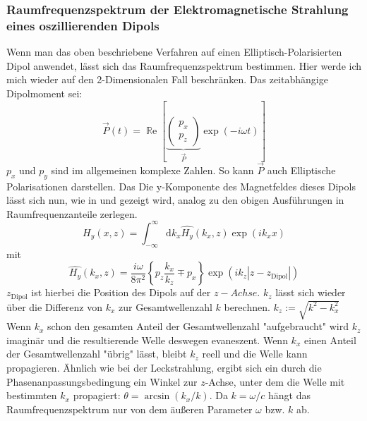 \documentclass[titlepage]{article}
\renewcommand{\Re}{\operatorname{\mathbb{R}e}}
\begin{document}
	\subsubsection{Raumfrequenzspektrum der Elektromagnetische Strahlung eines oszillierenden Dipols}
		\label{sec:spatial_freq_dip}
		Wenn man das oben beschriebene Verfahren auf einen Elliptisch-Polarisierten Dipol anwendet, lässt sich das Raumfrequenzspektrum bestimmen. Hier werde ich mich wieder auf den 2-Dimensionalen Fall beschränken. Das zeitabhängige Dipolmoment sei: 
		$$\vec{P}(t)= \Re\left[\underbrace{\begin{pmatrix} p_x \\ p_z \end{pmatrix}}_{\vec{P}} \exp(-i\omega t)\right]$$
		$p_x$ und $p_y$ sind im allgemeinen komplexe Zahlen. So kann $\vec{P}$ auch Elliptische Polarisationen darstellen. Das Die y-Komponente des Magnetfeldes dieses Dipols lässt sich nun, wie in \cite{Novotny.2012b} und \cite{RodriguezFortuno.2013} gezeigt wird, analog zu den obigen Ausführungen in Raumfrequenzanteile zerlegen.
		\begin{equation}
			H_y(x, z) = \int_{-\infty}^{\infty}\mathrm{d}k_x\hat{H_y}(k_x, z)\exp(ik _xx) 
		\end{equation}
		mit
		\begin{equation}
			\boxed{\hat{H_y}(k_x, z) = \dfrac{i\omega}{8\pi^2}\left\{p_z\dfrac{k_x}{k_z} \mp p_x\right\}\exp(ik_z|z-z_{\mathrm{Dipol}}|)}
		\end{equation}
	$z_{\mathrm{Dipol}}$ ist hierbei die Position des Dipols auf der $z-Achse$. $k_z$ lässt sich wieder über die Differenz von $k_x$ zur Gesamtwellenzahl $k$ berechnen. $k_z := \sqrt{k^2-k_x^2}$ Wenn $k_x$ schon den gesamten Anteil der Gesamtwellenzahl "aufgebraucht" wird $k_z$ imaginär und die resultierende Welle deswegen evaneszent. Wenn $k_x$ einen Anteil der Gesamtwellenzahl "übrig" lässt, bleibt $k_z$ reell und die Welle kann propagieren. Ähnlich wie bei der Leckstrahlung, ergibt sich ein durch die Phasenanpassungsbedingung ein Winkel zur $z$-Achse, unter dem die Welle mit bestimmten $k_x$ propagiert: $\theta = \arcsin(k_x/k)$. Da $k = \omega / c$  hängt das Raumfrequenzspektrum nur von dem äußeren Parameter $\omega$ bzw. $k$ ab. 
\end{document}
